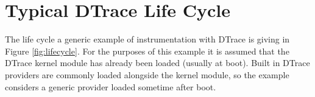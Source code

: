 
\section{Typical DTrace Life Cycle}


The life cycle a generic example of instrumentation with DTrace is giving in Figure \ref{fig:lifecycle}. For the purposes of this example it is assumed that the DTrace kernel module has already been loaded (usually at boot). Built in DTrace providers are commonly loaded alongside the kernel module, so the example considers a generic provider loaded sometime after boot.




